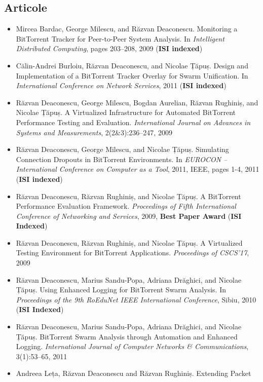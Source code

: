 \subsection{Articole}

\begin{itemize}
  \item Mircea Bardac, George Milescu, and Răzvan Deaconescu. Monitoring a
  BitTorrent Tracker for Peer-to-Peer System Analysis. In \textit{Intelligent
  Distributed Computing}, pages 203--208, 2009 (\textbf{ISI indexed})
  \item Călin-Andrei Burloiu, Răzvan Deaconescu, and Nicolae Țăpuș. Design and
  Implementation of a BitTorrent Tracker Overlay for Swarm Unification. In
  \textit{International Conference on Network Services}, 2011 (\textbf{ISI
  indexed})
  \item Răzvan Deaconescu, George Milescu, Bogdan Aurelian, Răzvan Rughiniș,
  and Nicolae Țăpuș. A Virtualized Infrastructure for Automated BitTorrent
  Performance Testing and Evaluation. \textit{International Journal on
  Advances in Systems and Measurements}, 2(2\&3):236--247, 2009
  \item Răzvan Deaconescu, George Milescu, and Nicolae Țăpuș. Simulating
  Connection Dropouts in BitTorrent Environments. In \textit{EUROCON --
  International Conference on Computer as a Tool}, 2011, IEEE, pages 1-4, 2011
  (\textbf{ISI indexed})
  \item Răzvan Deaconescu, Răzvan Rughiniș, and Nicolae Țăpuș. A BitTorrent
  Performance Evaluation Framework. \textit{Proceedings of Fifth International
  Conference of Networking and Services}, 2009, \textbf{Best Paper Award}
  (\textbf{ISI Indexed})
  \item Răzvan Deaconescu, Răzvan Rughiniș, and Nicolae Țăpuș. A Virtualized
  Testing Environment for BitTorrent Applications. \textit{Proceedings of
  CSCS'17}, 2009
  \item Răzvan Deaconescu, Marius Sandu-Popa, Adriana Drăghici, and Nicolae
  Țăpuș. Using Enhanced Logging for BitTorrent Swarm Analysis. In
  \textit{Proceedings of the 9th RoEduNet IEEE International Conference},
  Sibiu, 2010 (\textbf{ISI Indexed})
  \item Răzvan Deaconescu, Marius Sandu-Popa, Adriana Drăghici, and Nicolae
  Țăpuș. BitTorrent Swarm Analysis through Automation and Enhanced Logging.
  \textit{International Journal of Computer Networks \& Communications},
  3(1):53--65, 2011
  \item Andreea Leța, Răzvan Deaconescu and Răzvan Rughiniș. Extending Packet

\end{itemize}
